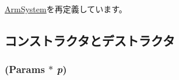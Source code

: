 \hyperlink{classArmSystem_a8ae84e66b34bac08937a6bad4412ba5d}{ArmSystem}を再定義しています。

\subsection{コンストラクタとデストラクタ}
\hypertarget{classLinuxArmSystem_a8bd9f34635b50e93feedccfe117e75bb}{
\subsubsection[{LinuxArmSystem}]{ ({\bf Params} $\ast$ {\em p})}}
\label{classLinuxArmSystem_a8bd9f34635b50e93feedccfe117e75bb}



